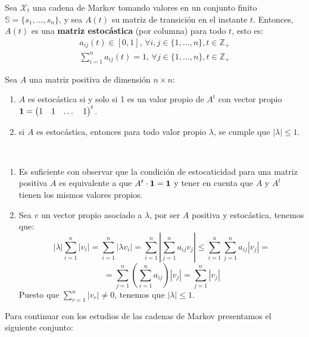 \begin{definition}
Sea $\mathcal{X}_t$ una cadena de Markov tomando valores en un conjunto finito $\mathbb{S}=\{s_1,...,s_n\}$, y sea $A(t)$ su matriz de transición en el instante $t$. Entonces, $A(t)$ es una \textbf{matriz estocástica} (por columna) para todo $t$, esto es:
\begin{align*}
a_{ij}(t)\in[0,1],\, \forall i,j \in \{1,...,n\}, t\in\mathbb{Z}_+\\
\sum_{i=1}^n a_{ij}(t)=1, \, \forall j\in\{1,...,n\}, t\in\mathbb{Z}_+
\end{align*}
\end{definition}

\begin{lemma}
Sea $A$ una matriz positiva de dimensión $n\times n$:
\begin{enumerate}
    \item $A$ es estocástica si y solo si 1 es un valor propio de $A^t$ con vector propio $\bold{1}=\begin{pmatrix}1 & 1 & \dots & 1\end{pmatrix}^t$.
    \item si $A$ es estocástica, entonces para todo valor propio $\lambda$, se cumple que  $\left|\lambda\right|\leq1.$
\end{enumerate}
\end{lemma}

\begin{proofs*}
\
\begin{enumerate}
    \item Es suficiente con observar que la condición de estocaticidad para una matriz positiva $A$ es equivalente a que $A^t\cdot\bold{1}=\bold{1}$ y tener en cuenta que $A$ y $A^t$ tienen los mismos valores propios.
    \item Sea $v$ un vector propio asociado a $\lambda$, por ser $A$ positiva y estocástica, tenemos que:
    \[
    \left|\lambda\right|\sum_{i=1}^n\left| v_i\right|=\sum_{i=1}^n\left|\lambda v_i\right|=\sum_{i=1}^n\left|\sum_{j=1}^n a_{ij}v_j\right|\leq\sum_{i=1}^n\sum_{j=1}^n a_{ij}\left|v_j\right|=\]
    \[=\sum_{j=1}^n\left( \sum_{i=1}^n a_{ij} \right) \left|v_j\right|=\sum_{j=1}^n\left|v_j\right|\]
    Puesto que $\sum_{r=1}^n\left|v_r\right|\neq0$, tenemos que $\left|\lambda\right|\leq1$.
\end{enumerate}

\end{proofs*}
Para continuar con los estudios de las cadenas de Markov presentamos el siguiente conjunto:

